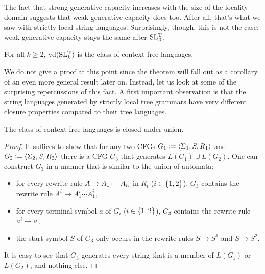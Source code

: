 The fact that strong generative capacity increases with the size of the locality domain suggests that weak generative capacity does too.
After all, that's what we saw with strictly local string languages.
Surprisingly, though, this is not the case: weak generative capacity stays the same after $\SLT[2]$.
%
\begin{theorem}
    For all $k \geq 2$, $\Yield(\SLT[k])$ is the class of context-free languages.
\end{theorem}
%
We do not give a proof at this point since the theorem will fall out as a corollary of an even more general result later on.
Instead, let us look at some of the surprising repercussions of this fact.
A first important observation is that the string languages generated by strictly local tree grammars have very different closure properties compared to their tree languages.
%
\begin{lemma}
    The class of context-free languages is closed under union.
\end{lemma}
%
\begin{proof}
    It suffices to show that for any two CFGs $G_1 \is \tuple{\Sigma_1,S,R_1}$ and $G_2 \is \tuple{\Sigma_2,S,R_2}$ there is a CFG $G_3$ that generates $L(G_1) \cup L(G_2)$.
    One can construct $G_3$ in a manner that is similar to the union of automata:
    \begin{itemize}
        \item for every rewrite rule $A \rewrite A_1 \cdots A_n$ in $R_i$ ($i \in \setof{1,2}$), $G_3$ contains the rewrite rule $A^i \rightarrow A_1^i \cdots A_1^i$,
        \item for every terminal symbol $a$ of $G_i$ ($i \in \setof{1,2}$), $G_3$ contains the rewrite rule $a^i \rewrite a$,
        \item the start symbol $S$ of $G_3$ only occurs in the rewrite rules $S \rightarrow S^1$ and $S \rightarrow S^2$.
    \end{itemize}
    It is easy to see that $G_3$ generates every string that is a member of $L(G_1)$ or $L(G_2)$, and nothing else.
\end{proof}
%
